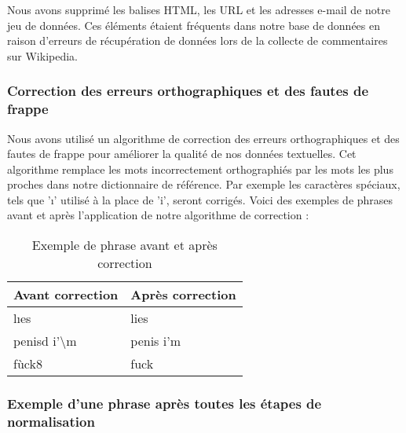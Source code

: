 Nous avons supprimé les balises HTML, les URL et les adresses e-mail de notre jeu de données. Ces éléments étaient fréquents dans notre base de données en raison d'erreurs de récupération de données lors de la collecte de commentaires sur Wikipedia.

\subsubsection*{Correction des erreurs orthographiques et des fautes de frappe}

Nous avons utilisé un algorithme de correction des erreurs orthographiques et des fautes de frappe pour améliorer la qualité de nos données textuelles. Cet algorithme remplace les mots incorrectement orthographiés par les mots les plus proches dans notre dictionnaire de référence. Par exemple les caractères spéciaux, tels que 'ı' utilisé à la place de 'i', seront corrigés. Voici des exemples de phrases avant et après l'application de notre algorithme de correction :

\begin{table}[h]
    \centering
    \begin{tabular}{|l|l|}
    \hline
    \textbf{Avant correction} & \textbf{Après correction} \\ \hline
    lıes  & lies \\ \hline
    penisd i'\textbackslash m & penis i'm  \\ \hline
    fùck8 & fuck  \\ \hline
    \end{tabular}
    \caption{Exemple de phrase avant et après correction}
\end{table}

\newpage
\subsubsection*{Exemple d'une phrase après toutes les étapes de normalisation}

